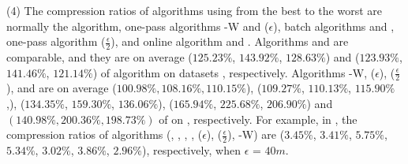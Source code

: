 \sstab(4) The compression ratios of algorithms using \sed from the best
to the worst are normally the \opt algorithm, one-pass algorithms {\cised-W} and \cised($\epsilon$), batch algorithms \tpa and
\dpa, one-pass algorithm \cised($\frac{\epsilon}{2}$), and online algorithm {\dagots} and \squishe.
%
{Algorithms \tpa and \dpa are comparable, and they are on average
($125.23\%$, $143.92\%$, $128.63\%$) and ($123.93\%$, $141.46\%$, $121.14\%$)
 of algorithm \opt on datasets \dSets, respectively.}
%
{Algorithms {\cised-W}, \cised(${\epsilon}$), \cised($\frac{\epsilon}{2}$), \squishe and {\dagots} are on average {($100.98\%, 108.16\%, 110.15\%$)}, ($109.27\%$, $110.13\%$, $115.90\%$,), ($134.35\%$, $159.30\%$, $136.06\%$), ($165.94\%$, $225.68\%$, $206.90\%$) and {$(140.98\%, 200.36\%, 198.73\%)$}
 of \opt on \dSets, respectively.}
%
For example, in \mopsi, the compression ratios of algorithms
(\tpa, \dpa, \squishe, {\dagots}, \cised(${\epsilon}$), \cised($\frac{\epsilon}{2}$),  {\cised-W})
are ($3.45\%$, $3.41\%$, $5.75\%$, {$5.34\%$}, $3.02\%$, $3.86\%$,  {$2.96\%$}), respectively, when $\epsilon$ = $40m$.
%
%
%


